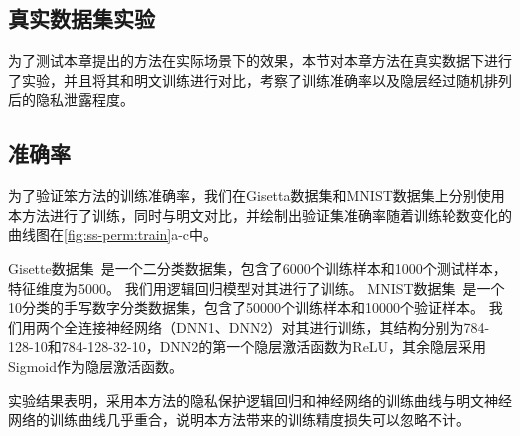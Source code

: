 \subsection{真实数据集实验}
为了测试本章提出的方法在实际场景下的效果，本节对本章方法在真实数据下进行了实验，并且将其和明文训练进行对比，考察了训练准确率以及隐层经过随机排列后的隐私泄露程度。

\subsection{准确率}
为了验证笨方法的训练准确率，我们在Gisetta数据集和MNIST数据集上分别使用本方法进行了训练，同时与明文对比，并绘制出验证集准确率随着训练轮数变化的曲线图在\autoref{fig:ss-perm:train}a-c中。

%
Gisette数据集~\cite{}是一个二分类数据集，包含了6000个训练样本和1000个测试样本，特征维度为5000。
我们用逻辑回归模型对其进行了训练。
%
MNIST数据集~\cite{mnist}是一个10分类的手写数字分类数据集，包含了50000个训练样本和10000个验证样本。
我们用两个全连接神经网络（DNN1、DNN2）对其进行训练，其结构分别为784-128-10和784-128-32-10，DNN2的第一个隐层激活函数为ReLU，其余隐层采用Sigmoid作为隐层激活函数。

实验结果表明，采用本方法的隐私保护逻辑回归和神经网络的训练曲线与明文神经网络的训练曲线几乎重合，说明本方法带来的训练精度损失可以忽略不计。


